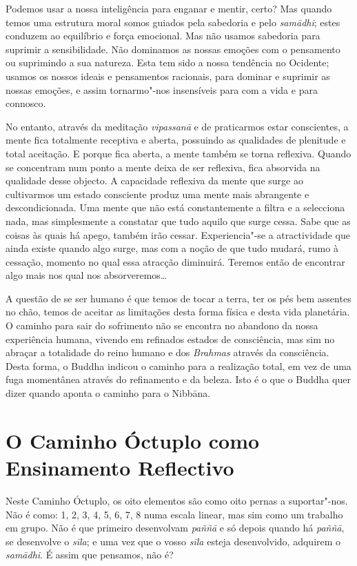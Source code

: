 Podemos usar a nossa inteligência para enganar e mentir, certo? Mas quando temos
uma estrutura moral somos guiados pela sabedoria e pelo \emph{samādhi}; estes
conduzem ao equilíbrio e força emocional. Mas não usamos sabedoria para suprimir
a sensibilidade. Não dominamos as nossas emoções com o pensamento ou suprimindo
a sua natureza. Esta tem sido a nossa tendência no Ocidente; usamos os nossos
ideais e pensamentos racionais, para dominar e suprimir as nossas emoções, e
assim tornarmo"-nos insensíveis para com a vida e para connosco.

No entanto, através da meditação \emph{vipassanā} e de praticarmos estar conscientes,
a mente fica totalmente receptiva e aberta, possuindo as qualidades de plenitude
e total aceitação. E porque fica aberta, a mente também se torna reflexiva.
Quando se concentram num ponto a mente deixa de ser reflexiva, fica absorvida
na qualidade desse objecto. A capacidade reflexiva da mente que surge ao cultivarmos
um estado consciente produz uma mente mais abrangente e descondicionada. 
Uma mente que não está constantemente a filtra e a selecciona nada, mas simplesmente a 
constatar que tudo aquilo que  surge cessa. Sabe que as coisas às quais há apego, também 
irão cessar. Experiencia"-se a atractividade que ainda existe quando algo surge, mas com 
a noção de que tudo mudará, rumo à cessação, momento no qual essa atracção diminuirá. 
Teremos então de encontrar algo mais nos qual nos absorveremos\ldots{}

A questão de se ser humano é que temos de tocar a terra, ter os pés bem assentes
no chão, temos de aceitar as limitações desta forma física e desta vida
planetária. O caminho para sair do sofrimento não se encontra no abandono da
nossa experiência humana, vivendo em refinados estados de consciência, mas sim no
abraçar a totalidade do reino humano e dos \emph{Brahmas} através da consciência. Desta forma, o Buddha indicou o caminho para a realização total, em vez
de uma fuga momentânea através do refinamento e da beleza. Isto é o que o Buddha
quer dizer quando aponta o caminho para o Nibbāna.

\section{O Caminho Óctuplo como Ensinamento Reflectivo}

Neste Caminho Óctuplo, os oito elementos são como oito pernas a suportar"-nos.
Não é como: 1, 2, 3, 4, 5, 6, 7, 8 numa escala linear, mas sim como um trabalho
em grupo. Não é que primeiro desenvolvam \emph{paññā} e só depois quando há
\emph{paññā}, se desenvolve o \emph{sīla}; e uma vez que o vosso \emph{sīla}
esteja desenvolvido, adquirem o \emph{samādhi}. É assim que pensamos, não é?

